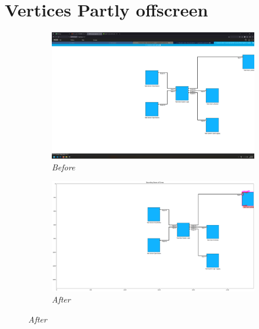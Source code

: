 \documentclass{article}
\begin{document}
\section{Vertices Partly offscreen}
\begin{figure}[H]
    \centering
    \begin{subfigure}[t]{0.9\textwidth}
        \centering
        \includegraphics[width=\textwidth]{testcases/vertex_offscreen_partly/140634-098602_input_image.png}
        \caption*{\textit{Before}}
    \end{subfigure}
    \newline
    \begin{subfigure}[t]{0.9\textwidth}
        \centering
        \includegraphics[width=\textwidth]{testcases/vertex_offscreen_partly/140653-729498_element_bbox_errors_labeled_colored.png}
        \caption*{\textit{After}}
    \end{subfigure}
    \label{fig:vertices_partly_offscreen}
\end{figure}
\newpage
\end{document}
